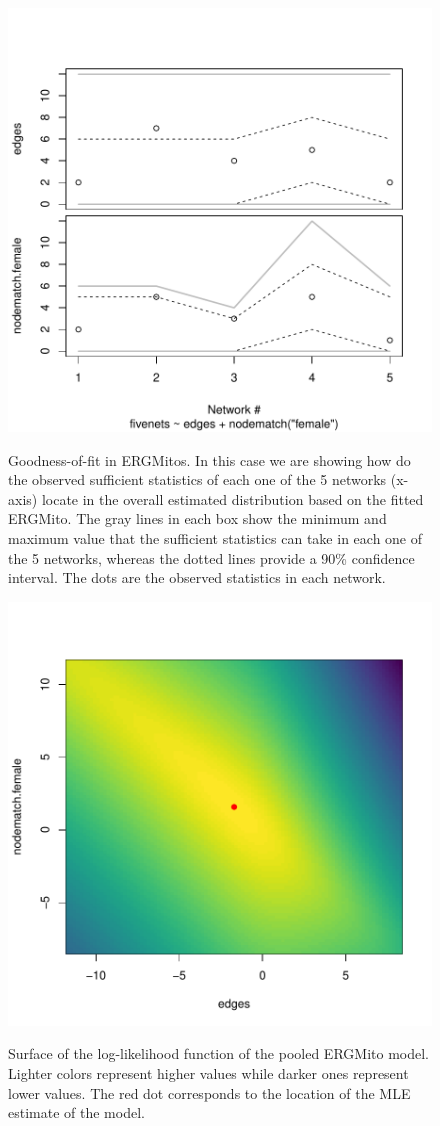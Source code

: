 \documentclass[12pt]{article}
\begin{document}
\begin{figure}
    \centering
    \caption{Goodness-of-fit in ERGMitos. In this case we are showing how do the observed sufficient statistics of each one of the 5 networks (x-axis) locate in the overall estimated distribution based on the fitted ERGMito. The gray lines in each box show the minimum and maximum value that the sufficient statistics can take in each one of the 5 networks, whereas the dotted lines provide a 90\% confidence interval. The dots are the observed statistics in each network.}
    \includegraphics[width=.7\linewidth]{figures/fivenets_gof.pdf}
    \label{fig:fivenets-gof}
\end{figure}

\begin{figure}
    \centering
    \caption{Surface of the log-likelihood function of the pooled ERGMito model. Lighter colors represent higher values while darker ones represent lower values. The red dot corresponds to the location of the MLE estimate of the model.}
    \includegraphics[width=.7\linewidth]{figures/fivenets_loglike.pdf}
    \label{fig:fivenets-loglike}
\end{figure}
\end{document}
